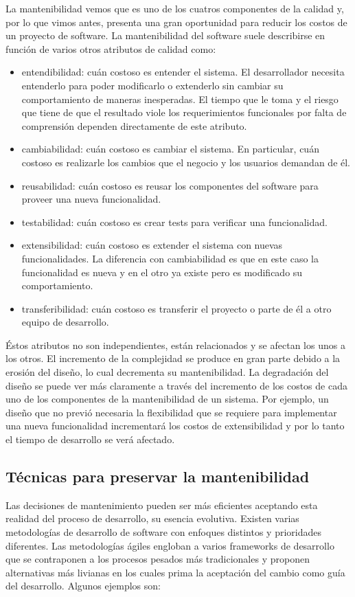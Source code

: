 La mantenibilidad vemos que es uno de los cuatros componentes de la calidad y,
por lo que vimos antes, presenta una gran oportunidad para reducir los costos de
un proyecto de software.  La mantenibilidad del software suele describirse en
función de varios otros atributos de calidad como:

\begin{itemize}
    \item entendibilidad: cuán costoso es entender el sistema. El desarrollador
      necesita entenderlo para poder modificarlo o extenderlo sin cambiar su
      comportamiento de maneras inesperadas. El tiempo que le toma y el riesgo
      que tiene de que el resultado viole los requerimientos funcionales por
      falta de comprensión dependen directamente de este atributo.
    \item cambiabilidad: cuán costoso es cambiar el sistema. En particular, cuán
      costoso es realizarle los cambios que el negocio y los usuarios demandan
      de él.
    \item reusabilidad: cuán costoso es reusar los componentes del software para
      proveer una nueva funcionalidad.
    \item testabilidad: cuán costoso es crear tests para verificar una
      funcionalidad.
    \item extensibilidad: cuán costoso es extender el sistema con nuevas
      funcionalidades. La diferencia con cambiabilidad es que en este caso la
      funcionalidad es nueva y en el otro ya existe pero es modificado su
      comportamiento.
    \item transferibilidad: cuán costoso es transferir el proyecto o parte de él
      a otro equipo de desarrollo.
\end{itemize}

Éstos atributos no son independientes, están relacionados y se afectan los unos
a los otros. El incremento de la complejidad se produce en gran parte debido a
la erosión del diseño, lo cual decrementa su mantenibilidad. La degradación del
diseño se puede ver más claramente a través del incremento de los costos de cada
uno de los componentes de la mantenibilidad de un sistema. Por ejemplo, un
diseño que no previó necesaria la flexibilidad que se requiere para implementar
una nueva funcionalidad incrementará los costos de extensibilidad y por lo tanto
el tiempo de desarrollo se verá afectado.


\subsection{Técnicas para preservar la mantenibilidad}
Las decisiones de mantenimiento pueden ser más eficientes aceptando esta
realidad del proceso de desarrollo, su esencia evolutiva. Existen varias
metodologías de desarrollo de software con enfoques distintos y prioridades
diferentes. Las metodologías ágiles engloban a varios frameworks de desarrollo
que se contraponen a los procesos pesados más tradicionales y proponen
alternativas más livianas en los cuales prima la aceptación del cambio como guía
del desarrollo. Algunos ejemplos son:

